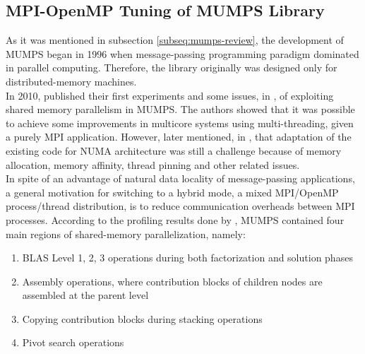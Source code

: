 \subsection{MPI-OpenMP Tuning of MUMPS Library}
\label{subseq:mpi-openmp}


As it was mentioned in subsection \ref{subseq:mumps-review}, the development of MUMPS began in 1996 when message-passing programming paradigm dominated in parallel computing. Therefore, the library originally was designed only for distributed-memory machines.\\

In 2010,  \citeauthor{chowdhury2010some} published their first experiments and some issues, in \cite{chowdhury2010some}, of exploiting shared memory parallelism in MUMPS. The authors showed that it was possible to achieve some improvements in multicore systems using multi-threading, given a purely MPI application. However, later \citeauthor{l2013introduction} mentioned, in \cite{l2013introduction}, that adaptation of the existing code for NUMA architecture was still a challenge because of memory allocation, memory affinity, thread pinning and other related issues.\\


In spite of an advantage of natural data locality of message-passing applications, a general motivation for switching to a hybrid mode, a mixed MPI/OpenMP process/thread distribution, is to reduce communication overheads between MPI processes. According to the profiling results done by \citeauthor{chowdhury2010some}, MUMPS contained four main regions of shared-memory parallelization, namely: 

\begin{enumerate}

	\item BLAS Level 1, 2, 3 operations during both factorization and solution phases \label{openmp-blocks-1}
	
	\item Assembly operations, where contribution blocks of children nodes are assembled at the parent level \label{openmp-blocks-2}
	
	\item Copying contribution blocks during stacking operations \label{openmp-blocks-3}
	
	\item Pivot search operations \label{openmp-blocks-4}

\end{enumerate}


